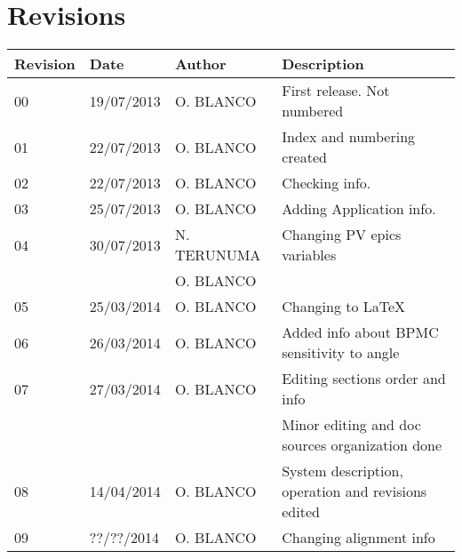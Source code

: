 \section{Revisions}
\begin{tabular}{|l|l|l|l|}\hline
Revision&Date&Author&Description\\\hline\hline
00&19/07/2013&O. BLANCO&First release. Not numbered\\\hline
01&22/07/2013&O. BLANCO&Index and numbering created\\\hline
02&22/07/2013&O. BLANCO&Checking info.\\\hline
03&25/07/2013&O. BLANCO&Adding Application info.\\\hline
04&30/07/2013&N. TERUNUMA&Changing PV epics variables\\
&&O. BLANCO&\\\hline
05&25/03/2014&O. BLANCO&Changing to \LaTeX\\\hline
06&26/03/2014&O. BLANCO&Added info about BPMC sensitivity to angle\\\hline
07&27/03/2014&O. BLANCO&Editing sections order and info\\
&&&Minor editing and doc sources organization done\\\hline
08&14/04/2014&O. BLANCO&System description, operation and revisions edited\\\hline
09&??/??/2014&O. BLANCO&Changing alignment info\\\hline
\end{tabular}


